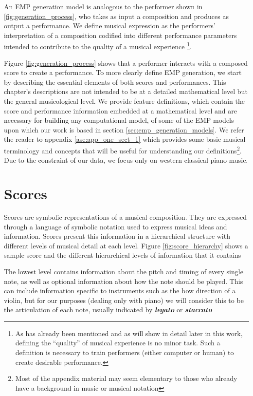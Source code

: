 An EMP generation model is analogous to the performer shown in \ref{fig:generation_process}, who takes as input a composition and produces as output a performance. We define musical expression as the performers' interpretation of a composition codified into different performance parameters intended to contribute to the quality of a musical experience%
\footnote{As has already been mentioned and as will show in detail later in this work, defining the ``quality'' of musical experience is no minor task. Such a definition is necessary to train performers (either computer or human) to create desirable performance.}. 

Figure \ref{fig:generation_process} shows that a performer interacts with a composed score to create a performance. To more clearly define EMP generation, we start by describing the essential elements of both scores and performances. This chapter's descriptions are not intended to be at a detailed mathematical level but the general musicological level. We provide feature definitions, which contain the score and performance information embedded at a mathematical level and are necessary for building any computational model, of some of the EMP models upon which our work is based in section \ref{sec:emp_generation_models}. We refer the reader to appendix \ref{ase:app_one_sect_1} which provides some basic musical terminology and concepts that will be useful for understanding our definitions\footnote{Most of the appendix material may seem elementary to those who already have a background in music or musical notation}. Due to the constraint of our data, we focus only on western classical piano music. 

\section{Scores}\label{sec:scores}
Scores are symbolic representations of a musical composition. They are expressed through a language of symbolic notation used to express musical ideas and information. Scores present this information in a hierarchical structure with different levels of musical detail at each level. Figure \ref{fig:score_hierarchy} shows a sample score and the different hierarchical levels of information that it contains

\newcommand{\mnot}[1]{\textbf{\emph{#1}}}

The lowest level contains information about the pitch and timing of every single note, as well as optional information about how the note should be played. This can include information specific to instruments such as the bow direction of a violin, but for our purposes (dealing only with piano) we will consider this to be the articulation of each note, usually indicated by \mnot{legato} or \mnot{staccato} 


